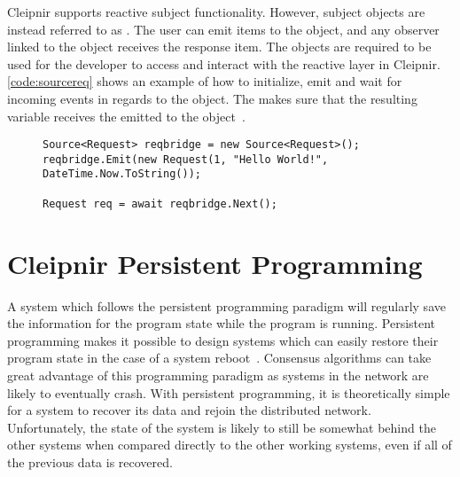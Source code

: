\iffalse
Cleipnir supports reactive subjects, however they are instead known as \code{Sources}. The user can emit items to the \code{Source} object, and any observer linked to it will receive the response item. The \code{Source} object needs to be used in order for the developer to access and interact with the reactive layer in Cleipnir. \autoref{code:sourcereq} shows an example on how to initialize, emit and wait for incoming events in regards to the \code{Source} object. The \code{await reqbridge.Next()} makes sure that the resulting variable \code{req} receives the \code{Request} emitted to the \code{Source} object~\cite[p.~8]{PAPER:PaxosCleipnir}.
\fi

Cleipnir supports reactive subject functionality. However, subject objects are instead referred to as . The user can emit items to the  object, and any observer linked to the  object receives the response item. The  objects are required to be used for the developer to access and interact with the reactive layer in Cleipnir. \autoref{code:sourcereq} shows an example of how to initialize, emit and wait for incoming events in regards to the  object. The  makes sure that the resulting variable  receives the  emitted to the  object~\cite[p.~8]{PAPER:PaxosCleipnir}.

\begin{figure}[H]
	\centering
	\begin{lstlisting}[label = code:sourcereq, caption=Source object example, captionpos=b, basicstyle=\scriptsize]
Source<Request> reqbridge = new Source<Request>();
reqbridge.Emit(new Request(1, "Hello World!", DateTime.Now.ToString());

Request req = await reqbridge.Next();
	\end{lstlisting}
\end{figure}

\iffalse
\section{Cleipnir Persistent Programming}
\label{section:PersistentProgramming}
A system which follows the persistent programming paradigm will regularly save the information for the program state while the program is running. Persistent programming makes it possible to design systems which can easily restore their program state in the case of a system reboot~\cites{DOC:Cleipnir}[p.~6]{PAPER:PaxosCleipnir}. Consensus algorithms can take great advantage of this programming paradigm as systems in the network are likely to eventually crash. With persistent programming, it is theoretically simple for a system to recover its data and rejoin the distributed network. Unfortunately, the state of the system is likely to still be somewhat behind the other systems when compared directly to the other working systems, even if all of the previous data is recovered. 

